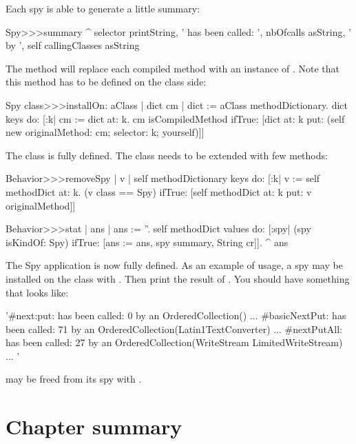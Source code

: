 \documentclass[a4paper,10pt,twoside]{book}
\begin{document}
Each spy is able to generate a little summary:

\begin{code}{}
Spy>>>summary
	^ selector printString, ' has been called: ', nbOfcalls asString, ' by ', self callingClasses asString
\end{code}

The  method will replace each compiled method with an instance of . Note that this method has to be defined on the class side:

\begin{code}{}
Spy class>>>installOn: aClass
	| dict cm |
	dict := aClass methodDictionary.
	dict keys do:
		[:k|
			cm := dict at: k.
			cm isCompiledMethod 
			 	ifTrue: [dict at: k put: (self new originalMethod: cm; selector: k; yourself)]]
			
\end{code}

The  class is fully defined. The  class needs to be extended with few methods:

\begin{code}{}
Behavior>>>removeSpy
	| v |
	self methodDictionary keys do:
		[:k|
			v := self methodDict at: k. 
			(v class == Spy)
					ifTrue: [self methodDict at: k put: v originalMethod]]

Behavior>>>stat
	| ans |
	ans := ''.
	self methodDict values do: 
		[:spy|
				(spy isKindOf: Spy)
					ifTrue: [ans := ans, spy summary, String cr]].
	^ ans
\end{code}

The Spy application is now fully defined. As an example of usage, a spy may be installed on the class  with . Then print the result of . You should have something that looks like:

\begin{code}{}
 '#next:put: has been called: 0 by an OrderedCollection()
...
#basicNextPut: has been called: 71 by an OrderedCollection(Latin1TextConverter)
...
#nextPutAll: has been called: 27 by an OrderedCollection(WriteStream LimitedWriteStream)
...
'
\end{code}

 may be freed from its spy with .


\section{Chapter summary}
\end{document}
